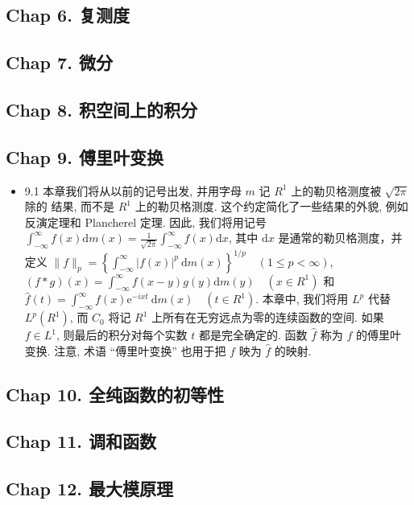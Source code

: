 \subsection{Chap 6. 复测度}

\subsection{Chap 7. 微分}

\subsection{Chap 8. 积空间上的积分}

\subsection{Chap 9. 傅里叶变换}

\begin{itemize}
\item 9.1 本章我们将从以前的记号出发, 并用字母 $m$ 记 $R^{1}$ 上的勒贝格测度被 $\sqrt{2 \pi}$ 除的 结果, 而不是 $R^{1}$ 上的勒贝格测度. 这个约定简化了一些结果的外貌, 例如反演定理和 Plancherel 定理. 因此, 我们将用记号 $\int_{-\infty}^{\infty} f(x) \mathrm{d} m(x)=\frac{1}{\sqrt{2 \pi}} \int_{-\infty}^{\infty} f(x) \mathrm{d} x$, 其中 $\mathrm{d} x$ 是通常的勒贝格测度，并定义 $\|f\|_{p}=\left\{\int_{-\infty}^{\infty}|f(x)|^{p} \mathrm{~d} m(x)\right\}^{1 / p} \quad(1 \leqslant p<\infty)$, $(f * g)(x)=\int_{-\infty}^{\infty} f(x-y) g(y) \mathrm{d} m(y) \quad\left(x \in R^{1}\right)$ 和 $\hat{f}(t)=\int_{-\infty}^{\infty} f(x) \mathrm{e}^{-i xt} \mathrm{~d} m(x) \quad\left(t \in R^{1}\right)$. 本章中, 我们将用 $L^{p}$ 代替 $L^{p}\left(R^{1}\right)$, 而 $C_{0}$ 将记 $R^{1}$ 上所有在无穷远点为零的连续函数的空间. 如果 $f \in L^{1}$, 则最后的积分对每个实数 $t$ 都是完全确定的. 函数 $\hat{f}$ 称为 $f$ 的傅里叶变换. 注意, 术语 “傅里叶变换” 也用于把 $f$ 映为 $\hat{f}$ 的映射.
\end{itemize}


\subsection{Chap 10. 全纯函数的初等性}

\subsection{Chap 11. 调和函数}

\subsection{Chap 12. 最大模原理}

